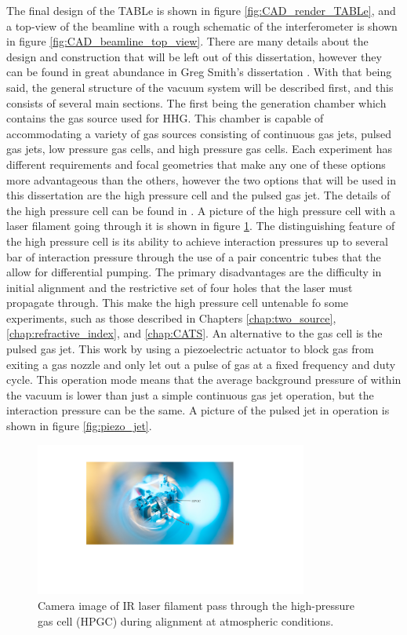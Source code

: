 The final design of the TABLe is shown in figure \ref{fig:CAD_render_TABLe}, and a top-view of the beamline with a rough schematic of the interferometer is shown in figure \ref{fig:CAD_beamline_top_view}. There are many details about the design and construction that will be left out of this dissertation, however they can be found in great abundance in Greg Smith's dissertation \cite{smithApplicationAttosecondTechniques2020}.  With that being said, the general structure of the vacuum system will be described first, and this consists of several main sections.  The first being the generation chamber which contains the gas source used for HHG.  This chamber is capable of accommodating a variety of gas sources consisting of continuous gas jets, pulsed gas jets, low pressure gas cells, and high pressure gas cells.  Each experiment has different requirements and focal geometries that make any one of these options more advantageous than the others, however the two options that will be used in this dissertation are the high pressure cell and the pulsed gas jet.  The details of the high pressure cell can be found in \cite{smithApplicationAttosecondTechniques2020}.  A picture of the high pressure cell with a laser filament going through it is shown in figure \ref{fig:HPGC_filament}.  The distinguishing feature of the high pressure cell is its ability to achieve interaction pressures up to several bar of interaction pressure through the use of a pair concentric tubes that the allow for differential pumping.  The primary disadvantages are the difficulty in initial alignment and the restrictive set of four holes that the laser must propagate through.  This make the high pressure cell untenable fo some experiments, such as those described in Chapters \ref{chap:two_source}, \ref{chap:refractive_index}, and \ref{chap:CATS}.  An alternative to the gas cell is the pulsed gas jet.  This work by using a piezoelectric actuator to block gas from exiting a gas nozzle and only let out a pulse of gas at a fixed frequency and duty cycle.  This operation mode means that the average background pressure of within the vacuum is lower than just a simple continuous gas jet operation, but the interaction pressure can be the same.  A picture of the pulsed jet in operation is shown in figure \ref{fig:piezo_jet}.
\label{sec:gas_source}
\begin{figure}
	\centering
	\includegraphics[width=0.8\textwidth]{figures/Beamline/HPGC.pdf}
	\caption[Image of laser passing through HPGC]{Camera image of IR laser filament pass through the high-pressure gas cell (HPGC) during alignment at atmospheric conditions.}
	\label{fig:HPGC_filament}
\end{figure}


